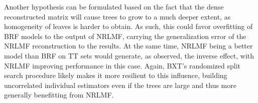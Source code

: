 

Another hypothesis can be formulated based on the fact that the dense reconstructed matrix will cause trees to grow to a much deeper extent, as homogeneity of leaves is harder to obtain. As such, this could favor overfitting of BRF models to the output of NRLMF, carrying the generalization error of the NRLMF reconstruction to the results. At the same time, NRLMF being a better model than BRF on TT sets would generate, as observed, the inverse effect, with NRLMF improving performance in this case. %
Again, BXT's randomized split search procedure likely makes it more resilient to this influence, building uncorrelated individual estimators even if the trees are large and thus more generally benefitting from NRLMF.

